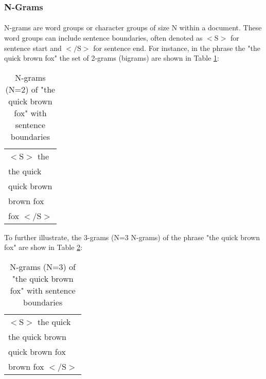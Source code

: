 	\subsubsection {N-Grams}
		\paragraph{} N-grams are word groups or character groups of size N within a document.  These word groups can include sentence boundaries, often denoted as $<\text{S}>$ for sentence start and $<\text{/S}>$ for sentence end. For instance, in the phrase the "the quick brown fox" the set of 2-grams (bigrams) are shown in Table \ref{table:2grams}:
		\begin{center}
			\begin{table}[h]
			\caption{N-grams (N=2) of "the quick brown fox" with sentence boundaries}
			\label{table:2grams}
				\begin{center}
					\begin{tabular}{l}
					$<\text{S}>$ the\\
					the quick\\
					quick brown\\
					brown fox\\
					fox $<\text{/S}>$\\
					\end{tabular}
				\end{center}
			\end{table}
		\end{center}
		
		To further illustrate, the 3-grams (N=3 N-grams) of the phrase "the quick brown fox" are show in Table \ref{table:3grams}:
		
		\begin{center}
			\begin{table}[h]
			\caption{N-grams (N=3) of "the quick brown fox" with sentence boundaries}
			\label{table:3grams}
				\begin{center}
					\begin{tabular}{l}
					$<\text{S}>$ the quick\\
					the quick brown \\
					quick brown fox\\
					brown fox $<\text{/S}>$\\
					\end{tabular}
				\end{center}
			\end{table}
		\end{center}
		

